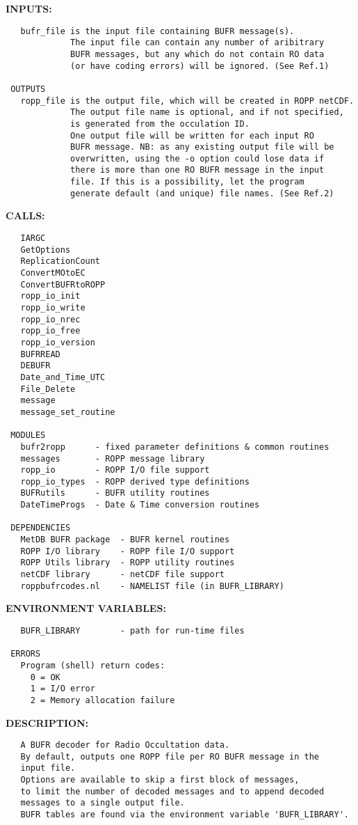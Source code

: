 \textbf{INPUTS:}\hspace{0.08in}\begin{Verbatim}
   bufr_file is the input file containing BUFR message(s).
             The input file can contain any number of aribitrary
             BUFR messages, but any which do not contain RO data
             (or have coding errors) will be ignored. (See Ref.1)

 OUTPUTS
   ropp_file is the output file, which will be created in ROPP netCDF.
             The output file name is optional, and if not specified,
             is generated from the occulation ID.
             One output file will be written for each input RO
             BUFR message. NB: as any existing output file will be
             overwritten, using the -o option could lose data if
             there is more than one RO BUFR message in the input
             file. If this is a possibility, let the program
             generate default (and unique) file names. (See Ref.2)
\end{Verbatim}
\textbf{CALLS:}\hspace{0.08in}\begin{Verbatim}
   IARGC
   GetOptions
   ReplicationCount
   ConvertMOtoEC
   ConvertBUFRtoROPP
   ropp_io_init
   ropp_io_write
   ropp_io_nrec
   ropp_io_free
   ropp_io_version
   BUFRREAD
   DEBUFR
   Date_and_Time_UTC
   File_Delete
   message
   message_set_routine

 MODULES
   bufr2ropp      - fixed parameter definitions & common routines
   messages       - ROPP message library
   ropp_io        - ROPP I/O file support
   ropp_io_types  - ROPP derived type definitions
   BUFRutils      - BUFR utility routines
   DateTimeProgs  - Date & Time conversion routines

 DEPENDENCIES
   MetDB BUFR package  - BUFR kernel routines
   ROPP I/O library    - ROPP file I/O support
   ROPP Utils library  - ROPP utility routines
   netCDF library      - netCDF file support
   roppbufrcodes.nl    - NAMELIST file (in BUFR_LIBRARY)
\end{Verbatim}
\textbf{ENVIRONMENT VARIABLES:}\hspace{0.08in}\begin{Verbatim}
   BUFR_LIBRARY        - path for run-time files

 ERRORS
   Program (shell) return codes:
     0 = OK
     1 = I/O error
     2 = Memory allocation failure
\end{Verbatim}
\textbf{DESCRIPTION:}\hspace{0.08in}\begin{Verbatim}
   A BUFR decoder for Radio Occultation data.
   By default, outputs one ROPP file per RO BUFR message in the
   input file.
   Options are available to skip a first block of messages,
   to limit the number of decoded messages and to append decoded
   messages to a single output file.
   BUFR tables are found via the environment variable 'BUFR_LIBRARY'.
\end{Verbatim}
